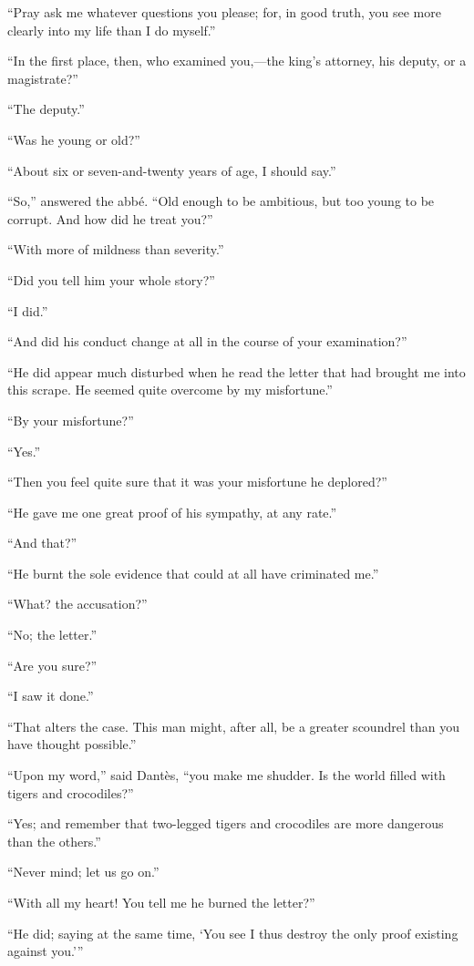 “Pray ask me whatever questions you please; for, in good truth, you see
more clearly into my life than I do myself.”

“In the first place, then, who examined you,—the king’s attorney, his
deputy, or a magistrate?”

“The deputy.”

“Was he young or old?”

“About six or seven-and-twenty years of age, I should say.”

“So,” answered the abbé. “Old enough to be ambitious, but too young to
be corrupt. And how did he treat you?”

“With more of mildness than severity.”

“Did you tell him your whole story?”

“I did.”

“And did his conduct change at all in the course of your examination?”

“He did appear much disturbed when he read the letter that had brought
me into this scrape. He seemed quite overcome by my misfortune.”

“By your misfortune?”

“Yes.”

“Then you feel quite sure that it was your misfortune he deplored?”

“He gave me one great proof of his sympathy, at any rate.”

“And that?”

“He burnt the sole evidence that could at all have criminated me.”

“What? the accusation?”

“No; the letter.”

“Are you sure?”

“I saw it done.”

“That alters the case. This man might, after all, be a greater
scoundrel than you have thought possible.”

“Upon my word,” said Dantès, “you make me shudder. Is the world filled
with tigers and crocodiles?”

“Yes; and remember that two-legged tigers and crocodiles are more
dangerous than the others.”

“Never mind; let us go on.”

“With all my heart! You tell me he burned the letter?”

“He did; saying at the same time, ‘You see I thus destroy the only
proof existing against you.’”


